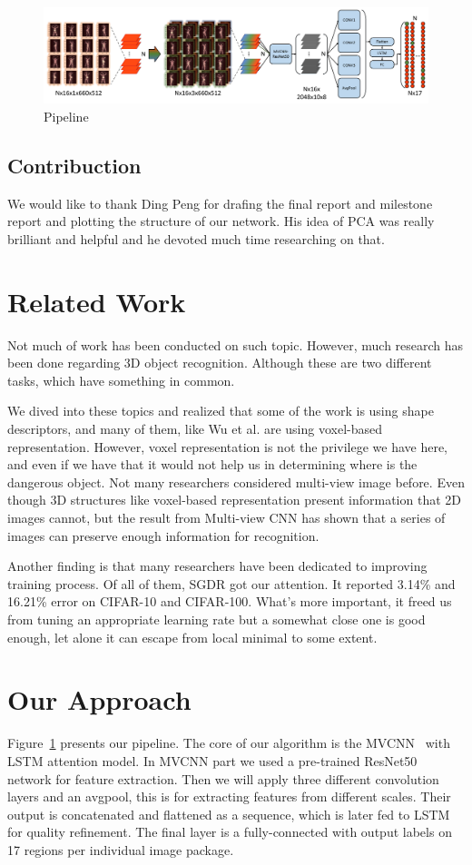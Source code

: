 \documentclass[conference,compsoc]{IEEEtran}
\begin{document}
\begin{figure}[!t]
\includegraphics[width=\textwidth]{../Pic/Network.pdf}
\caption{Pipeline}
\label{network}
\end{figure}
\subsection{Contribuction}
\par We would like to thank Ding Peng for drafing the final report and milestone report and plotting the structure of our network. His idea of PCA was really brilliant and helpful and he devoted much time researching on that.
\section{Related Work}
Not much of work has been conducted on such topic. However, much research has been done regarding 3D object recognition. Although these are two different tasks, which have something in common.

We dived into these topics and realized that some of the work is using shape descriptors, and many of them, like Wu et al. \cite{wu20153d} are using voxel-based representation. However, voxel representation is not the privilege we have here, and even if we have that it would not help us in determining where is the dangerous object.
Not many researchers considered multi-view image before. Even though 3D structures like voxel-based representation present information that 2D images cannot, but the result from Multi-view CNN\cite{su15mvcnn}\cite{qi2016volumetric} has shown that a series of images can preserve enough information for recognition.

Another finding is that many researchers have been dedicated to improving training process. Of all of them, SGDR got our attention. It reported 3.14\% and 16.21\% error on CIFAR-10 and CIFAR-100. What's more important, it freed us from tuning an appropriate learning rate but a somewhat close one is good enough, let alone it can escape from local minimal to some extent.


\section{Our Approach}
Figure~\ref{network} presents our pipeline. The core of our algorithm is the MVCNN~\cite{su15mvcnn} with LSTM attention model. In MVCNN part we used a pre-trained ResNet50\cite{he2016deep} network for feature extraction. Then we will apply three different convolution layers and an avgpool, this is for extracting features from different scales. Their output is concatenated and flattened as a sequence, which is later fed to LSTM for quality refinement. The final layer is a fully-connected with output labels on 17 regions per individual image package.
\end{document}
